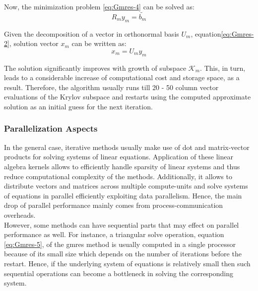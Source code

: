 Now, the minimization problem \ref{eq:Gmres-4} can be solved as:\\

\begin{equation} \label{eq:Gmres-5}
	R_m y_{m} = \tilde{b_m}
\end{equation}

Given the decomposition of a vector in orthonormal basis $U_{m}$, equation\ref{eq:Gmres-2}, solution vector $x_{m}$ can be written as:\\

\begin{equation} \label{eq:Gmres-6}
	x_m = U_m y_{m}  
\end{equation}


The solution significantly improves with growth of subspace $\mathcal{K}_{m}$. This, in turn, leads to a considerable increase of computational cost and storage space, as a result. Therefore, the algorithm usually runs till 20 - 50 column vector evaluations of the Krylov subspace and restarts using the computed approximate solution as an initial guess for the next iteration.\\


\subsubsection{Parallelization Aspects}
\label{subseq:iterative-parallel-aspects}


In the general case, iterative methods usually make use of dot and matrix-vector products for solving systems of linear equations. Application of these linear algebra kernels allows to efficiently handle sparsity of linear systems and thus reduce computational complexity of the methods. Additionally, it allows to distribute vectors and matrices across multiple compute-units and solve systems of equations in parallel efficiently exploiting data parallelism. Hence, the main drop of parallel performance mainly comes from process-communication overheads.\\


However, some methods can have sequential parts that may effect on parallel performance as well. For instance, a triangular solve operation,  equation \ref{eq:Gmres-5}, of the \gls{gmres} method is usually computed in a single processor because of its small size which depends on the number of iterations before the restart. Hence, if the underlying system of equations is relatively small then such sequential operations can become a bottleneck in solving the corresponding system.\\


